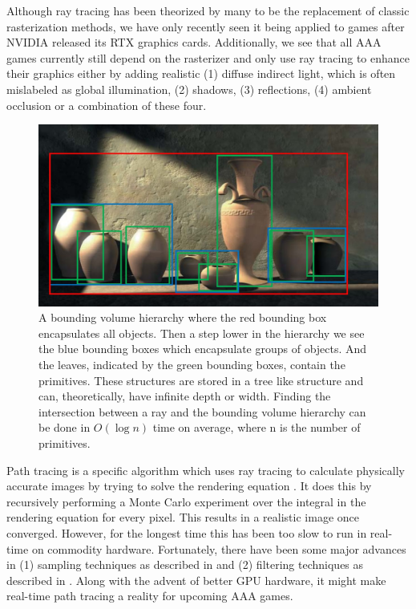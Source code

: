 Although ray tracing has been theorized by many to be the replacement of classic rasterization methods, we have only recently seen it being applied to games after NVIDIA released its RTX graphics cards. Additionally, we see that all AAA games currently still depend on the rasterizer and only use ray tracing to enhance their graphics either by adding realistic (1) diffuse indirect light, which is often mislabeled as global illumination, (2) shadows, (3) reflections, (4) ambient occlusion or a combination of these four\cite{NVIDIARTX}.
\begin{figure}[H]
    \centering
    \includegraphics[width=0.9\linewidth]{figures/bvh.jpg}
    \caption{A bounding volume hierarchy where the red bounding box encapsulates all objects. Then a step lower in the hierarchy we see the blue bounding boxes which encapsulate groups of objects. And the leaves, indicated by the green bounding boxes, contain the primitives. These structures are stored in a tree like structure and can, theoretically, have infinite depth or width. Finding the intersection between a ray and the bounding volume hierarchy can be done in $O(\log n)$ time on average, where n is the number of primitives. \cite{BVHJacco}}
    \label{fig:bvh}
\end{figure}

Path tracing is a specific algorithm which uses ray tracing to calculate physically accurate images by trying to solve the rendering equation \cite{kajiya1986rendering}. It does this by recursively performing a Monte Carlo experiment over the integral in the rendering equation for every pixel. This results in a realistic image once converged. However, for the longest time this has been too slow to run in real-time on commodity hardware. Fortunately, there have been some major advances in (1) sampling techniques as described in \cite{lin2022generalized} and (2) filtering techniques as described in \cite{yang2020survey}. Along with the advent of better GPU hardware, it might make real-time path tracing a reality for upcoming AAA games.

